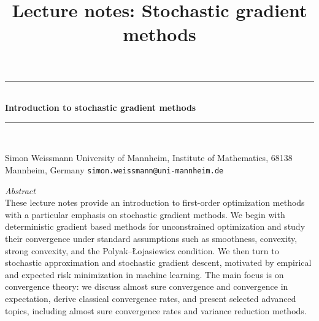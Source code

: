 \documentclass[12pt,openany]{book}
\title{Lecture notes: Stochastic gradient methods}
\theoremstyle{definition}
\theoremstyle{definition}
\newcommand{\HRule}{\rule{\linewidth}{0.5mm}} %
\begin{document}
 

\begin{center}
\HRule \\[0.4cm]
{ \huge \bfseries Introduction to stochastic gradient methods}\\[0.4cm] %
\HRule \\[1.5cm]
\begin{minipage}{0.9\textwidth}
\begin{flushleft} \large
Simon {Weissmann} \newline
\normalsize University of Mannheim, Institute of Mathematics, 68138 Mannheim, Germany\newline
\small \texttt{simon.weissmann@uni-mannheim.de}
\end{flushleft}


\end{minipage}


\vspace{2cm}

\begin{minipage}{0.7\textwidth}
\emph{Abstract}\\
These lecture notes provide an introduction to first-order optimization methods with a particular emphasis on stochastic gradient methods. We begin with deterministic gradient based methods for unconstrained optimization and study their convergence under standard assumptions such as smoothness, convexity, strong convexity, and the Polyak--{\L}ojasiewicz condition. We then turn to stochastic approximation and stochastic gradient descent, motivated by empirical and expected risk minimization in machine learning. The main focus is on convergence theory: we discuss almost sure convergence and convergence in expectation, derive classical convergence rates, and present selected advanced topics, including almost sure convergence rates and variance reduction methods.
\end{minipage}\\[0.5cm]
\end{center}

\newpage
\end{document}
